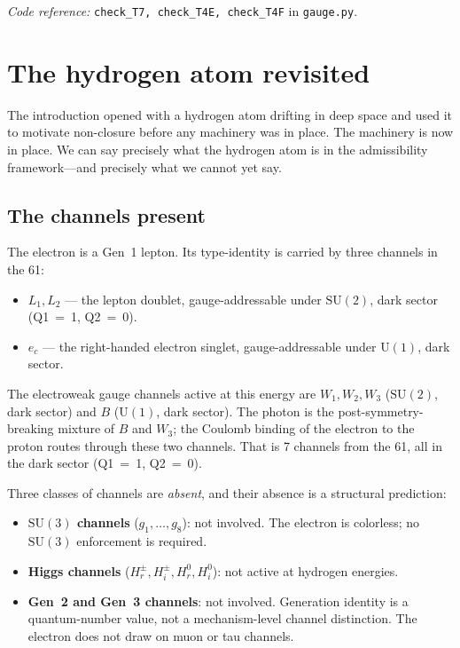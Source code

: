 \documentclass[11pt]{article}
\newenvironment{varlist}{\begin{itemize}[nosep,leftmargin=2em]}{\end{itemize}}
\newcommand{\coderef}[2]{\smallskip\noindent\textit{Code reference:} \texttt{#1} in \texttt{#2}.}
\newcommand{\SU}{\mathrm{SU}}
\newcommand{\U}{\mathrm{U}}
\begin{document}
\coderef{check\_T7, check\_T4E, check\_T4F}{gauge.py}


\section{The hydrogen atom revisited}
\label{sec:hydrogen_revisited}

The introduction opened with a hydrogen atom drifting in deep space and
used it to motivate non-closure before any machinery was in place.  The
machinery is now in place.  We can say precisely what the hydrogen atom
is in the admissibility framework---and precisely what we cannot yet say.

\subsection*{The channels present}

The electron is a Gen~1 lepton.  Its type-identity is carried by three
channels in the 61:

\begin{varlist}
\item $L_1, L_2$ --- the lepton doublet, gauge-addressable under
$\SU(2)$, dark sector (Q1~=~1, Q2~=~0).
\item $e_c$ --- the right-handed electron singlet, gauge-addressable
under $\U(1)$, dark sector.
\end{varlist}

The electroweak gauge channels active at this energy are $W_1, W_2, W_3$
($\SU(2)$, dark sector) and $B$ ($\U(1)$, dark sector).  The photon is
the post-symmetry-breaking mixture of $B$ and $W_3$; the Coulomb binding
of the electron to the proton routes through these two channels.  That is
7 channels from the 61, all in the dark sector (Q1~=~1, Q2~=~0).

Three classes of channels are \emph{absent}, and their absence is a
structural prediction:

\begin{varlist}
\item \textbf{$\SU(3)$ channels} ($g_1,\ldots,g_8$): not involved.  The
electron is colorless; no $\SU(3)$ enforcement is required.
\item \textbf{Higgs channels} ($H^\pm_r, H^\pm_i, H^0_r, H^0_i$): not
active at hydrogen energies.
\item \textbf{Gen~2 and Gen~3 channels}: not involved.  Generation
identity is a quantum-number value, not a mechanism-level channel
distinction.  The electron does not draw on muon or tau channels.
\end{varlist}
\end{document}
